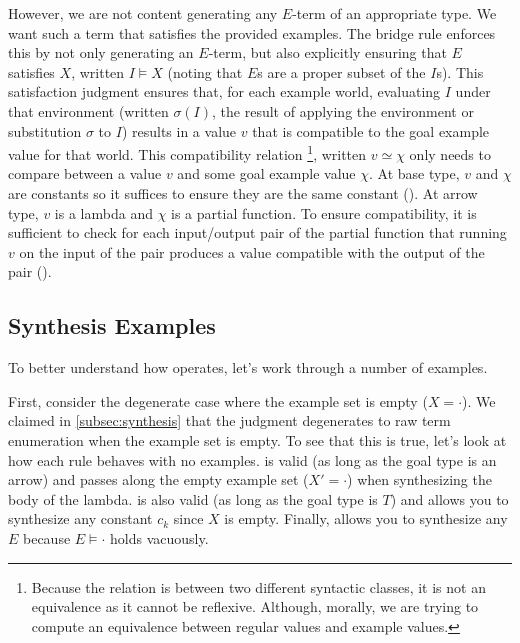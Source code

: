 However, we are not content generating any $E$-term of an appropriate type.
We want such a term that satisfies the provided examples.
The bridge rule  enforces this by not only generating an $E$-term, but also explicitly ensuring that $E$ satisfies $Χ$, written $I ⊨ Χ$ (noting that $E$s are a proper subset of the $I$s).
This satisfaction judgment ensures that, for each example world, evaluating $I$ under that environment (written $σ(I)$, the result of applying the environment or substitution $σ$ to $I$) results in a value $v$ that is compatible to the goal example value for that world.
This compatibility relation%
\footnote{%
  Because the relation is between two different syntactic classes, it is not an equivalence as it cannot be reflexive.
  Although, morally, we are trying to compute an equivalence between regular values and example values.
},
written $v ≃ χ$ only needs to compare between a value $v$ and some goal example value $χ$.
At base type, $v$ and $χ$ are constants so it suffices to ensure they are the same constant ().
At arrow type, $v$ is a lambda and $χ$ is a partial function.
To ensure compatibility, it is sufficient to check for each input/output pair of the partial function that running $v$ on the input of the pair produces a value compatible with the output of the pair ().

\subsection{Synthesis Examples}
\label{subsec:synthesis-examples}

To better understand how \lsyn{} operates, let's work through a number of examples.

\begin{example}
  First, consider the degenerate case where the example set is empty ($Χ = ·$).
  We claimed in \autoref{subsec:synthesis} that the  judgment degenerates to raw term enumeration when the example set is empty.
  To see that this is true, let's look at how each  rule behaves with no examples.
   is valid (as long as the goal type is an arrow) and passes along the empty example set ($X' = ·$) when synthesizing the body of the lambda.
   is also valid (as long as the goal type is $T$) and allows you to synthesize any constant $c_k$ since $X$ is empty.
  Finally,  allows you to synthesize any $E$ because $E ⊨ ·$ holds vacuously.
\end{example}

